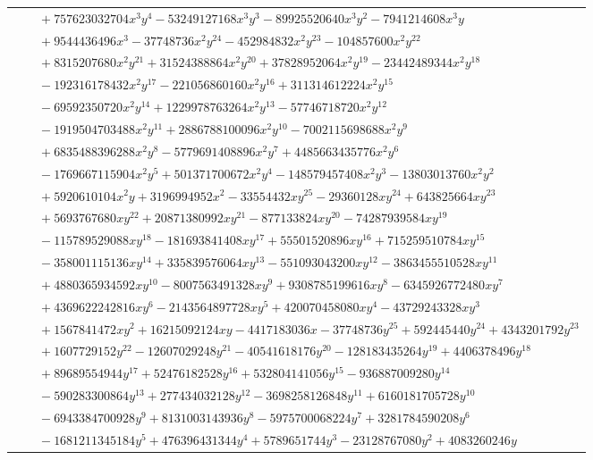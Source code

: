 \documentclass[11pt]{article}
\begin{document}
\begin{longtable}{@{}ll@{}}
 & $\quad +757623032704x^{3}y^{4}-53249127168x^{3}y^{3}-89925520640x^{3}y^{2}-7941214608x^{3}y$\\
 & $\quad +9544436496x^{3}-37748736x^{2}y^{24}-452984832x^{2}y^{23}-104857600x^{2}y^{22}$\\
 & $\quad +8315207680x^{2}y^{21}+31524388864x^{2}y^{20}+37828952064x^{2}y^{19}-23442489344x^{2}y^{18}$\\
 & $\quad -192316178432x^{2}y^{17}-221056860160x^{2}y^{16}+311314612224x^{2}y^{15}$\\
 & $\quad -69592350720x^{2}y^{14}+1229978763264x^{2}y^{13}-57746718720x^{2}y^{12}$\\
 & $\quad -1919504703488x^{2}y^{11}+2886788100096x^{2}y^{10}-7002115698688x^{2}y^{9}$\\
 & $\quad +6835488396288x^{2}y^{8}-5779691408896x^{2}y^{7}+4485663435776x^{2}y^{6}$\\
 & $\quad -1769667115904x^{2}y^{5}+501371700672x^{2}y^{4}-148579457408x^{2}y^{3}-13803013760x^{2}y^{2}$\\
 & $\quad +5920610104x^{2}y+3196994952x^{2}-33554432xy^{25}-29360128xy^{24}+643825664xy^{23}$\\
 & $\quad +5693767680xy^{22}+20871380992xy^{21}-877133824xy^{20}-74287939584xy^{19}$\\
 & $\quad -115789529088xy^{18}-181693841408xy^{17}+55501520896xy^{16}+715259510784xy^{15}$\\
 & $\quad -358001115136xy^{14}+335839576064xy^{13}-551093043200xy^{12}-3863455510528xy^{11}$\\
 & $\quad +4880365934592xy^{10}-8007563491328xy^{9}+9308785199616xy^{8}-6345926772480xy^{7}$\\
 & $\quad +4369622242816xy^{6}-2143564897728xy^{5}+420070458080xy^{4}-43729243328xy^{3}$\\
 & $\quad +1567841472xy^{2}+16215092124xy-4417183036x-37748736y^{25}+592445440y^{24}+4343201792y^{23}$\\
 & $\quad +1607729152y^{22}-12607029248y^{21}-40541618176y^{20}-128183435264y^{19}+4406378496y^{18}$\\
 & $\quad +89689554944y^{17}+52476182528y^{16}+532804141056y^{15}-936887009280y^{14}$\\
 & $\quad -590283300864y^{13}+277434032128y^{12}-3698258126848y^{11}+6160181705728y^{10}$\\
 & $\quad -6943384700928y^{9}+8131003143936y^{8}-5975700068224y^{7}+3281784590208y^{6}$\\
 & $\quad -1681211345184y^{5}+476396431344y^{4}+5789651744y^{3}-23128767080y^{2}+4083260246y$\\

\end{longtable}
\end{document}
